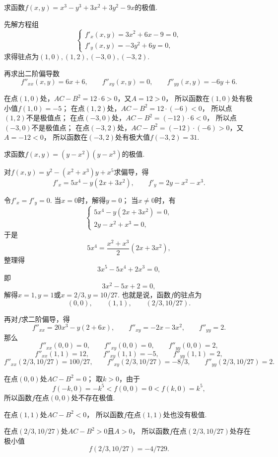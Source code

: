\begin{example}
求函数\(f(x,y) = x^3-y^3+3x^2+3y^2-9x\)的极值.
\begin{solution}
先解方程组\[
	\left\{ \begin{array}{l}
		f'_x(x,y) = 3x^2+6x-9 = 0, \\
		f'_y(x,y) = -3y^2+6y = 0,
	\end{array} \right.
\]
求得驻点为\((1,0),(1,2),(-3,0),(-3,2)\).

再求出二阶偏导数\[
	f''_{xx}(x,y) = 6x+6,
	\qquad
	f''_{xy}(x,y) = 0,
	\qquad
	f''_{yy}(x,y) = -6y+6.
\]

在点\((1,0)\)处，\(AC-B^2=12\cdot6>0\)，又\(A=12>0\)，
所以函数在\((1,0)\)处有极小值\(f(1,0)=-5\)；
在点\((1,2)\)处，\(AC-B^2=12\cdot(-6)<0\)，
所以点\((1,2)\)不是极值点；
在点\((-3,0)\)处，\(AC-B^2=(-12)\cdot6<0\)，
所以点\((-3,0)\)不是极值点；
在点\((-3,2)\)处，\(AC-B^2=(-12)\cdot(-6)>0\)，又\(A=-12<0\)，
所以函数在\((-3,2)\)处有极大值\(f(-3,2)=31\).
\end{solution}
\end{example}

\begin{example}
求函数\(f(x,y) = (y-x^2)(y-x^3)\)的极值.
\begin{solution}
对\(f(x,y) = y^2 - (x^2+x^3) y + x^5\)求偏导，得\[
	f'_x = 5x^4 - y(2x+3x^2),
	\qquad
	f'_y = 2y - x^2 - x^3.
\]

令\(f'_x = f'_y = 0\).
当\(x=0\)时，解得\(y = 0\)；
当\(x\neq0\)时，有\[
	\begin{cases}
		5x^4-y(2x+3x^2) = 0, \\
		2y-x^2+x^3 = 0,
	\end{cases}
\]
于是\[
	5x^4 = \frac{x^2+x^3}{2}(2x+3x^2),
\]
整理得\[
	3x^5-5x^4+2x^3=0,
\]
即\[
	3x^2-5x+2=0,
\]
解得\(x=1,y=1\)或\(x=2/3,y=10/27\).
也就是说，函数\(f\)的驻点为\[
	(0,0), \qquad
	(1,1), \qquad
	(2/3,10/27).
\]

再对\(f\)求二阶偏导，得\[
	f''_{xx} = 20x^3 - y(2+6x),
	\qquad
	f''_{xy} = -2x-3x^2,
	\qquad
	f''_{yy} = 2.
\]
那么
\[
	f''_{xx}(0,0) = 0,
	\qquad
	f''_{xy}(0,0) = 0,
	\qquad
	f''_{yy}(0,0) = 2,
\]\[
	f''_{xx}(1,1) = 12,
	\qquad
	f''_{xy}(1,1) = -5,
	\qquad
	f''_{yy}(1,1) = 2,
\]\[
	f''_{xx}(2/3,10/27) = 100/27,
	\qquad
	f''_{xy}(2/3,10/27) = -8/3,
	\qquad
	f''_{yy}(2/3,10/27) = 2.
\]

在点\((0,0)\)处\(AC-B^2 = 0\)；
取\(k>0\)，由于\[
f(-k,0) = -k^5 < f(0,0) = 0 < f(k,0) = k^5,
\]所以函数\(f\)在点\((0,0)\)处不存在极值.

在点\((1,1)\)处\(AC-B^2 < 0\)，
所以函数\(f\)在点\((1,1)\)处也没有极值.

在点\((2/3,10/27)\)处\(AC-B^2 > 0\)且\(A>0\)，
所以函数\(f\)在点\((2/3,10/27)\)处存在极小值\[
	f(2/3,10/27) = -4/729.
\]
\end{solution}
\end{example}

